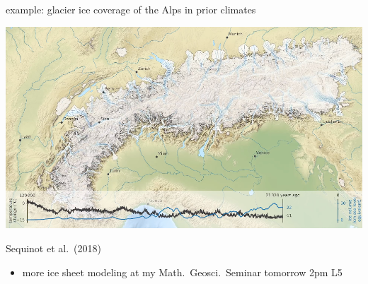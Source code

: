 \documentclass[svgnames,
               hyperref={colorlinks,citecolor=DeepPink4,linkcolor=FireBrick,urlcolor=Maroon},
               usepdftitle=false]  %
               {beamer}
\begin{document}
\begin{frame}{example: glacier ice coverage of the Alps in prior climates}

\includegraphics[width=1.02\textwidth]{../talk-oxford/images/alps-seguinot2018.png}

\vspace{-2mm}
\hfill {\tiny Sequinot et al.~(2018)}

{\footnotesize
\begin{itemize}
\item<2> more ice sheet modeling at my Math.~Geosci.~Seminar tomorrow 2pm L5
\end{itemize}
}
\end{frame}
\end{document}
